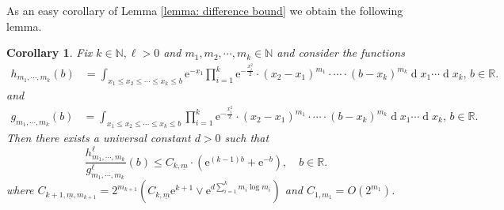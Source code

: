 \documentclass[11pt, reqno]{amsart}
\numberwithin{equation}{section}
\newcounter{dummy} \numberwithin{dummy}{section}
\newtheorem{corollary}[dummy]{Corollary}
\newcommand{\N}{\ensuremath{\mathbb{N}}}
\newcommand{\R}{\ensuremath{\mathbb{R}}}
\newcommand{\diff}{\ensuremath{\operatorname{d}\!}}
\begin{document}
As an easy corollary of Lemma \ref{lemma: difference bound} we obtain the following lemma. 
\begin{corollary}
     Fix $k\in \N, \ell> 0$ and $m_1, m_2, \cdots, m_k \in \N$ and consider the functions
    \begin{equation*}
        \begin{array}{rr}
            h_{m_1, \cdots, m_k}(b) &= \displaystyle\int_{x_1\le x_2\le \cdots\le x_k\le b}\mathrm{e}^{-x_1}\prod_{i=1}^{k}\mathrm{e}^{-\frac{x_i^2}{2}}\cdot(x_2-x_1)^{m_1}\cdot \cdots \cdot (b-x_k)^{m_k}\diff x_1\cdots \diff x_{k},\, b\in \R.
        \end{array}
    \end{equation*}
    and 
    \begin{equation*}
        \begin{array}{rr}
            g_{m_1, \cdots, m_k}(b) &= \displaystyle\int_{x_1\le x_2\le \cdots\le x_k\le b}\prod_{i=1}^{k}\mathrm{e}^{-\frac{x_i^2}{2}}\cdot(x_2-x_1)^{m_1}\cdot \cdots \cdot (b-x_k)^{m_k}\diff x_1\cdots \diff x_{k},\, b\in \R.
        \end{array}
    \end{equation*}
    Then there exists a universal constant $d>0$ such that 
    \[
     \frac{h^{\ell}_{m_1, \cdots, m_k}}{g^{\ell}_{m_1, \cdots, m_k}}(b)\le  C_{k,\underline{m}} \cdot (\mathrm{e}^{(k-1)b}+\mathrm{e}^{-b}), \quad b\in \R.
    \]
    where $C_{k+1, \underline{m},m_{k+1}} = 2^{m_{k+1}}(C_{k,\underline{m}}\mathrm{e}^{k+1}\lor \mathrm{e}^{d\sum_{i=1}^k m_i\log m_i})$ and $C_{1, m_1} = O(2^{m_1})$.
\end{corollary}
\end{document}

